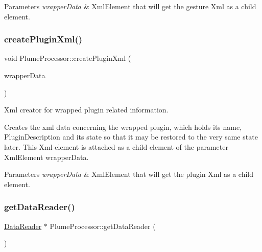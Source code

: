 \begin{DoxyParams}{Parameters}
{\em wrapper\+Data} & Xml\+Element that will get the gesture Xml as a child element. \\
\hline
\end{DoxyParams}
\mbox{\label{class_plume_processor_ad29b07ddcd526e44529e361374c8c99e}} 
\subsubsection{\texorpdfstring{create\+Plugin\+Xml()}{createPluginXml()}}
{\footnotesize\ttfamily void Plume\+Processor\+::create\+Plugin\+Xml (\begin{DoxyParamCaption}\item[{Xml\+Element \&}]{wrapper\+Data }\end{DoxyParamCaption})}



Xml creator for wrapped plugin related information. 

Creates the xml data concerning the wrapped plugin, which holds it\textquotesingle{}s name, Plugin\+Description and it\textquotesingle{}s state so that it may be restored to the very same state later. This Xml element is attached as a child element of the parameter Xml\+Element wrapper\+Data.


\begin{DoxyParams}{Parameters}
{\em wrapper\+Data} & Xml\+Element that will get the plugin Xml as a child element. \\
\hline
\end{DoxyParams}
\mbox{\label{class_plume_processor_ab24c4b6857ca26d462fce6be9e23cedd}} 
\subsubsection{\texorpdfstring{get\+Data\+Reader()}{getDataReader()}}
{\footnotesize\ttfamily \mbox{\hyperlink{class_data_reader}{Data\+Reader}} $\ast$ Plume\+Processor\+::get\+Data\+Reader (\begin{DoxyParamCaption}{ }\end{DoxyParamCaption})}



